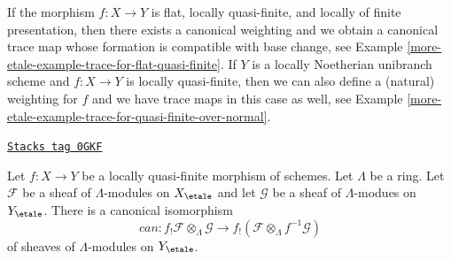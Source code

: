 \medskip\noindent
If the morphism $f : X \to Y$ is flat, locally quasi-finite, and locally of
finite presentation, then there exists a canonical weighting
and we obtain a canonical trace map whose formation is
compatible with base change, see
Example \ref{more-etale-example-trace-for-flat-quasi-finite}.
If $Y$ is a locally Noetherian unibranch scheme and $f : X \to Y$
is locally quasi-finite, then we can also define a (natural)
weighting for $f$ and we have trace maps in this case as well, see
Example \ref{more-etale-example-trace-for-quasi-finite-over-normal}.

\begin{lemma}
\label{more-etale-lemma-f-shriek-projection}
\href{https://stacks.math.columbia.edu/tag/0GKF}{\texttt{Stacks tag 0GKF}}

Let $f : X \to Y$ be a locally quasi-finite morphism of schemes.
Let $\Lambda$ be a ring.
Let $\mathcal{F}$ be a sheaf of $\Lambda$-modules on $X_\etale$
and let $\mathcal{G}$ be a sheaf of $\Lambda$-modues on $Y_\etale$.
There is a canonical isomorphism
$$
can :
f_!\mathcal{F} \otimes_\Lambda \mathcal{G}
\longrightarrow
f_!(\mathcal{F} \otimes_\Lambda f^{-1}\mathcal{G})
$$
of sheaves of $\Lambda$-modules on $Y_\etale$.
\end{lemma}

